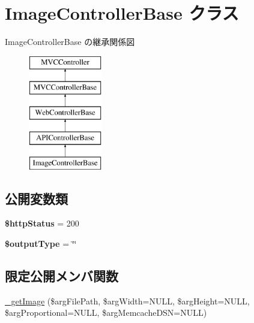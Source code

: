 \hypertarget{class_image_controller_base}{}\section{Image\+Controller\+Base クラス}
\label{class_image_controller_base}
Image\+Controller\+Base の継承関係図\begin{figure}[H]
\begin{center}
\leavevmode
\includegraphics[height=5.000000cm]{class_image_controller_base}
\end{center}
\end{figure}
\subsection*{公開変数類}
\begin{DoxyCompactItemize}
\item 
\hypertarget{class_image_controller_base_a48518f64bd926bab64265066a1aa6145}{}{\bfseries \$http\+Status} = 200\label{class_image_controller_base_a48518f64bd926bab64265066a1aa6145}

\item 
\hypertarget{class_image_controller_base_a46898a279a531bb5e6c8b0fe0e15d1cd}{}{\bfseries \$output\+Type} = \char`\"{}\char`\"{}\label{class_image_controller_base_a46898a279a531bb5e6c8b0fe0e15d1cd}

\end{DoxyCompactItemize}
\subsection*{限定公開メンバ関数}
\begin{DoxyCompactItemize}
\item 
\hyperlink{class_image_controller_base_a0eaea96edabf75b7ac4da68173ab4c56}{\+\_\+get\+Image} (\$arg\+File\+Path, \$arg\+Width=N\+U\+L\+L, \$arg\+Height=N\+U\+L\+L, \$arg\+Proportional=N\+U\+L\+L, \$arg\+Memcache\+D\+S\+N=N\+U\+L\+L)
\end{DoxyCompactItemize}
